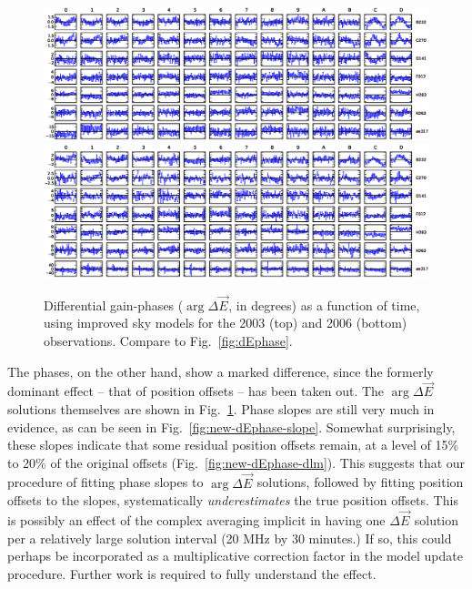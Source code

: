 \documentclass[]{aa}
\newcommand{\jones}[2]{\vec {#1}_{#2}}
\begin{document}
\begin{figure}
\sidecaption
\parbox[b]{12cm}{
\includegraphics[width=12cm]{o2003new_dEphase_mean}
\includegraphics[width=12cm]{o2006new_dEphase_mean}
}
\caption{\label{fig:new-dEphase}Differential gain-phases ($\arg\Delta\jones{E}{}$, in degrees) as a function of time, using improved sky models for the 2003 (top) and 2006 (bottom) observations. Compare to Fig.~\ref{fig:dEphase}.}
\end{figure}

The phases, on the other hand, show a marked difference, since the formerly dominant effect -- that of position offsets -- has been taken out. The $\arg\Delta\jones{E}{}$ solutions themselves are shown in Fig.~\ref{fig:new-dEphase}. Phase slopes are still very much in evidence, as can be seen in Fig.~\ref{fig:new-dEphase-slope}. Somewhat surprisingly, these slopes indicate that some residual position offsets remain, at a level of 15\% to 20\% of the original offsets (Fig.~\ref{fig:new-dEphase-dlm}). This suggests that our procedure of fitting phase slopes to $\arg\Delta\jones{E}{}$ solutions, followed by fitting position offsets to the slopes, systematically \emph{underestimates} the true position offsets. This is possibly an effect of the complex averaging implicit in having one $\Delta\jones{E}{}$ solution per a relatively large solution interval (20 MHz by 30 minutes.) If so, this could perhaps be incorporated as a multiplicative correction factor in the model update procedure. Further work is required to fully understand the effect. 

\end{document}
